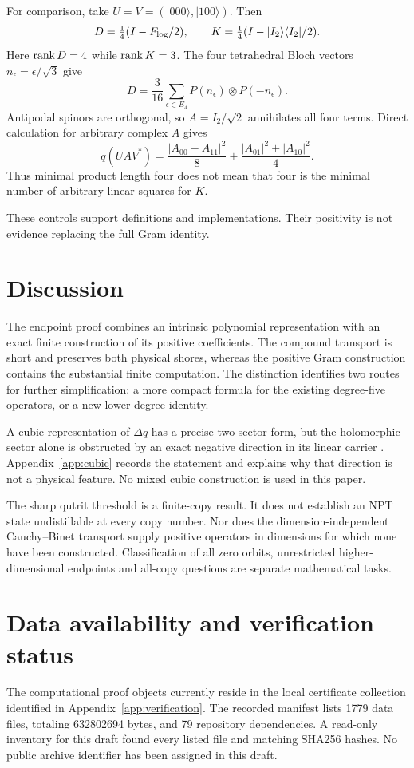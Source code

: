 \documentclass[11pt,a4paper]{article}
\theoremstyle{definition}\newtheorem{definition}[theorem]{Definition}
\theoremstyle{remark}\newtheorem{remark}[theorem]{Remark}
\newcommand{\ket}[1]{|#1\rangle}\newcommand{\bra}[1]{\langle#1|}
\numberwithin{equation}{section}
\begin{document}
For comparison, take
$U=V=(\ket{000},\ket{100})$. Then
\[
D=\tfrac14(I-F_{\rm log}/2),\qquad
K=\tfrac14(I-\ket{I_2}\bra{I_2}/2).
\]
Here $\operatorname{rank} D=4$ while $\operatorname{rank} K=3$.
The four tetrahedral Bloch vectors $n_\epsilon=\epsilon/\sqrt3$
give
\[
D=\frac3{16}\sum_{\epsilon\in E_4}
P(n_\epsilon)\otimes P(-n_\epsilon).
\]
Antipodal spinors are orthogonal, so $A=I_2/\sqrt2$ annihilates
all four terms. Direct calculation for arbitrary complex $A$ gives
\[
q(UAV^*)=\frac{|A_{00}-A_{11}|^2}{8}
       +\frac{|A_{01}|^2+|A_{10}|^2}{4}.
\]
Thus minimal product length four does not mean that four is the
minimal number of arbitrary linear squares for $K$.

These controls support definitions and implementations.
Their positivity is not evidence replacing the full Gram identity.

\section{Discussion}
The endpoint proof combines an intrinsic polynomial representation
with an exact finite construction of its positive coefficients.
The compound transport is short and preserves both physical shores,
whereas the positive Gram construction contains the substantial
finite computation. The distinction identifies two routes for
further simplification: a more compact formula for the existing
degree-five operators, or a new lower-degree identity.

A cubic representation of $\Delta q$ has a precise two-sector
form, but the holomorphic sector alone is obstructed by an exact
negative direction in its linear carrier \cite{compound}.
Appendix~\ref{app:cubic} records the statement and explains why that
direction is not a physical feature. No mixed cubic construction is
used in this paper.

The sharp qutrit threshold is a finite-copy result.
It does not establish an NPT state undistillable at every copy number.
Nor does the dimension-independent Cauchy--Binet transport supply
positive operators in dimensions for which none have been constructed.
Classification of all zero orbits, unrestricted higher-dimensional
endpoints and all-copy questions are separate mathematical tasks.

\section*{Data availability and verification status}\label{sec:availability}
The computational proof objects currently reside in the local
certificate collection identified in Appendix~\ref{app:verification}.
The recorded manifest lists 1779 data files, totaling 632802694 bytes,
and 79 repository dependencies. A read-only inventory for this draft
found every listed file and matching SHA256 hashes. No public archive
identifier has been assigned in this draft.
\end{document}

